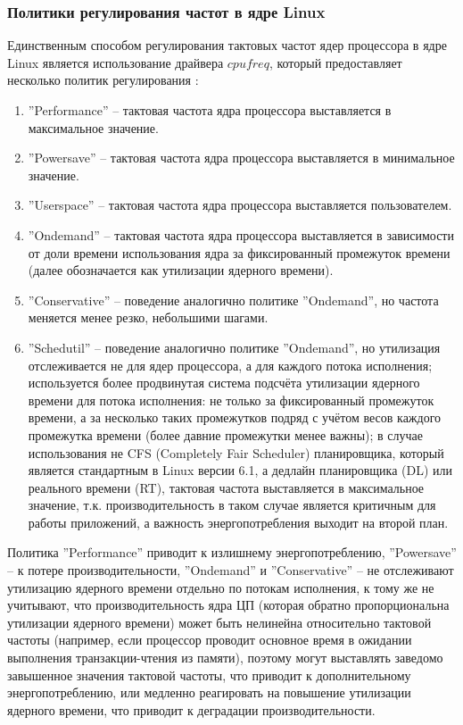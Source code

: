 \subsubsection{Политики регулирования частот в ядре Linux}

    Единственным способом регулирования тактовых частот ядер процессора в ядре Linux является
    использование драйвера $cpufreq$, который предоставляет несколько политик
    регулирования \cite{KernelCPUfreq}:
    \begin{enumerate}
        \item ''Performance'' -- тактовая частота ядра процессора выставляется в максимальное значение.
        \item ''Powersave'' -- тактовая частота ядра процессора выставляется в минимальное значение.
        \item ''Userspace'' -- тактовая частота ядра процессора выставляется пользователем.
        \item ''Ondemand'' -- тактовая частота ядра процессора выставляется в зависимости от доли времени
        использования ядра за фиксированный промежуток времени (далее обозначается как утилизации
        ядерного времени).
        \item ''Conservative'' -- поведение аналогично политике ''Ondemand'', но частота меняется менее
        резко, небольшими шагами.
        \item ''Schedutil'' \cite{KernelDocsSchedutil} -- поведение аналогично политике ''Ondemand'',
        но утилизация отслеживается не для ядер процессора, а для каждого потока исполнения;
        используется более продвинутая система подсчёта утилизации ядерного времени для потока исполнения:
        не только за фиксированный промежуток времени, а за несколько таких промежутков подряд с учётом
        весов каждого промежутка времени (более давние промежутки менее важны); в случае использования
        не CFS (Completely Fair Scheduler) планировщика, который является стандартным в Linux версии 6.1,
        а дедлайн планировщика (DL) или реального времени (RT), тактовая частота выставляется в
        максимальное значение, т.к. производительность в таком случае является критичным для работы приложений,
        а важность энергопотребления выходит на второй план.
    \end{enumerate}

    Политика ''Performance'' приводит к излишнему энергопотреблению, ''Powersave'' -- к потере
    производительности, ''Ondemand'' и ''Conservative'' -- не отслеживают утилизацию ядерного времени
    отдельно по потокам исполнения, к тому же не учитывают, что производительность ядра ЦП (которая
    обратно пропорциональна утилизации ядерного времени) может быть нелинейна относительно тактовой
    частоты (например, если процессор проводит основное время в ожидании выполнения транзакции-чтения
    из памяти), поэтому могут выставлять заведомо завышенное значения тактовой частоты, что приводит
    к дополнительному энергопотреблению, или медленно реагировать на повышение утилизации ядерного времени,
    что приводит к деградации производительности.

